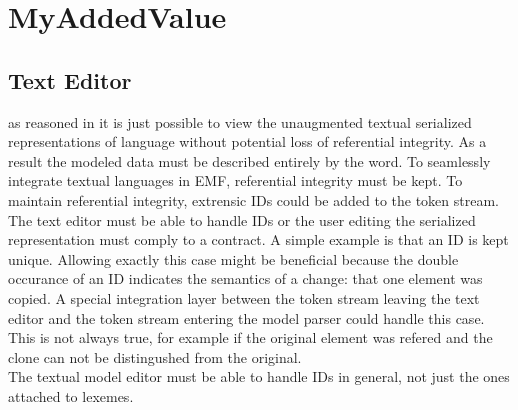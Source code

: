 \chapter{MyAddedValue}

\section{Text Editor}
as reasoned in  it is just possible to view the unaugmented textual serialized representations of language without potential loss of referential integrity. As a result the modeled data must be described entirely by the word. To seamlessly integrate textual languages in EMF, referential integrity must be kept. To maintain referential integrity, extrensic IDs could be added  to the token stream. The text editor must be able to handle IDs or the user editing the serialized representation must comply to a contract. A simple example is that an ID is kept unique. Allowing exactly this case might be beneficial because the double occurance of an ID indicates the semantics of a change: that one element was copied. A special integration layer between the token stream leaving the text editor and the token stream entering the model parser could handle this case. This is not always true, for example if the original element was refered and the clone can not be distingushed from the original. \\
The textual model editor must be able to handle IDs in general, not just the ones attached to lexemes. 





